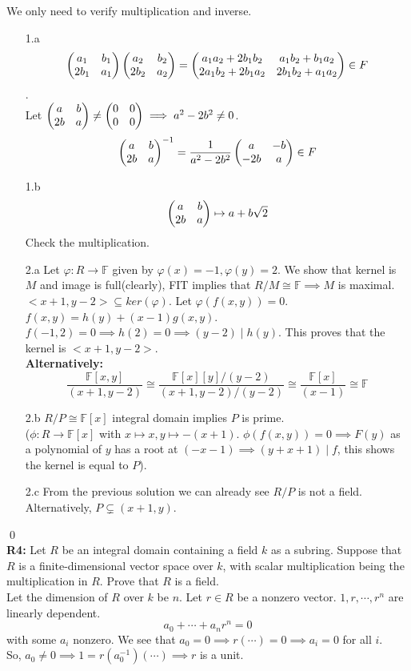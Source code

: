\soln
We only need to verify multiplication and inverse.
\begin{itemize}
	\item[1.a] $$ \begin{pmatrix} a_1 & b_1\\ 2b_1 & a_1 \end{pmatrix}\begin{pmatrix} a_2 & b_2\\ 2b_2 & a_2 \end{pmatrix}=\begin{pmatrix} a_1a_2 + 2b_1b_2 & a_1b_2+b_1a_2\\ 2a_1b_2+2b_1a_2 & 2b_1b_2+a_1a_2 \end{pmatrix}\in F $$. \\
	Let $ \begin{pmatrix} a & b\\ 2b & a \end{pmatrix}\ne \begin{pmatrix} 0 & 0\\ 0 & 0 \end{pmatrix}\implies a^2 -2b^2 \ne 0 $.
	$$ \begin{pmatrix} a & b\\ 2b & a \end{pmatrix}^{-1}= \frac{1}{a^2-2b^2}\begin{pmatrix} a & -b\\ -2b & a \end{pmatrix}\in F $$
	\item[1.b] $$ \begin{pmatrix} a & b\\ 2b & a \end{pmatrix}\mapsto a + b\sqrt{2} $$ Check the multiplication.
	\item[2.a] Let $ \varphi: R \to \mathbb{F} $ given by $ \varphi(x) = -1, \varphi(y)=2 $. We show that kernel is $ M $ and image is full(clearly), FIT implies that $ R/M \cong \mathbb{F} \implies M $ is maximal.\\
	$ <x+1,y-2>\subseteq ker(\varphi) $. Let $ \varphi(f(x,y))=0 $. $ f(x,y)= h(y)+ (x-1)g(x,y) $.\\
	$ f(-1,2)=0 \implies h(2)=0 \implies (y-2)\mid h(y)$. This proves that the kernel is $ <x+1,y-2> $.\\
	\textbf{Alternatively:} $$ \dfrac{\mathbb{F}[x,y]}{(x+1,y-2)} \cong \dfrac{\mathbb{F}[x][y]/(y-2)}{(x+1,y-2)/(y-2)} \cong \dfrac{\mathbb{F}[x]}{(x-1)} \cong \mathbb{F} $$
	\item[2.b] $ R/P \cong \mathbb{F}[x] $ integral domain implies $ P $ is prime.\\
	($ \phi: R \to \mathbb{F}[x] $ with $ x\mapsto x, y \mapsto -(x+1) $. $ \phi(f(x,y))=0 \implies F(y)$ as a polynomial of $ y $ has a root at $ (-x-1) \implies (y+x+1) \mid f $, this shows the kernel is equal to $ P $).
	\item[2.c] From the previous solution we can already see $ R/P $ is not a field. Alternatively, $ P\subsetneq (x+1,y) $.  
\end{itemize}
\qed\\
\textbf{R4:} Let $R$ be an integral domain containing a field $k$ as a subring. Suppose that $R$ is a finite-dimensional vector space over $k$, with scalar multiplication being the multiplication in $R$. Prove that $R$ is a field.\\
\soln Let the dimension of $ R $ over $ k $ be $ n $. Let $ r\in R $ be a nonzero vector. $ 1,r,\cdots,r^{n} $ are linearly dependent. $$ a_0 + \cdots + a_n r^n = 0$$ with some $ a_i $ nonzero. We see that $ a_0=0 \implies r(\cdots)=0 \implies a_i =0$ for all $ i $. \\
So, $ a_0 \ne 0 \implies 1 = r(a_0^{-1})(\cdots) \implies r$ is a unit.\\
